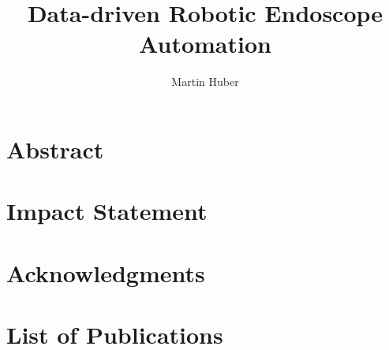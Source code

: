 \documentclass[british,a4paper,11pt,twoside]{ThesisStyle}
\title{Data-driven Robotic Endoscope Automation}\let\thetitle\@title
\author{Martin Huber}\let\theauthor\@author
\begin{document}
\frontmatter



\dominitoc


\copyrightpage{\the\year}{\theauthor}


\cleardoublepage


\cleardoublepage

\declarationpage{\theauthor}

\cleardoublepage
\chapter{Abstract}


\cleardoublepage
\chapter{Impact Statement}


\cleardoublepage
\chapter{Acknowledgments}


\cleardoublepage
\chapter{List of Publications}



\printglossary[type=\acronymtype]

\cleardoublepage
{}
\tableofcontents

\clearpage
{}
\mtcaddchapter[\listtablename]
\listoftables

\clearpage
{}
\mtcaddchapter[\listfigurename]
\listoffigures

\mainmatter








\appendix


\backmatter

\printbibliography[heading=bibintoc]
\end{document}
